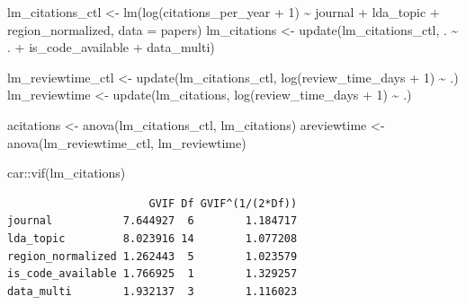 \documentclass[
  authoryear,
  review,
  3p]{elsarticle}
\newenvironment{Shaded}{\begin{snugshade}}{\end{snugshade}}
\newcommand{\AttributeTok}[1]{\textcolor[rgb]{0.40,0.45,0.13}{#1}}
\newcommand{\DecValTok}[1]{\textcolor[rgb]{0.68,0.00,0.00}{#1}}
\newcommand{\FunctionTok}[1]{\textcolor[rgb]{0.28,0.35,0.67}{#1}}
\newcommand{\NormalTok}[1]{\textcolor[rgb]{0.00,0.23,0.31}{#1}}
\newcommand{\OtherTok}[1]{\textcolor[rgb]{0.00,0.23,0.31}{#1}}
\newcommand{\SpecialCharTok}[1]{\textcolor[rgb]{0.37,0.37,0.37}{#1}}
\begin{document}
\begin{Shaded}
\begin{Highlighting}[]
\NormalTok{lm\_citations\_ctl }\OtherTok{\textless{}{-}} \FunctionTok{lm}\NormalTok{(}\FunctionTok{log}\NormalTok{(citations\_per\_year }\SpecialCharTok{+} \DecValTok{1}\NormalTok{) }\SpecialCharTok{\textasciitilde{}}\NormalTok{ journal }\SpecialCharTok{+}\NormalTok{ lda\_topic }\SpecialCharTok{+}\NormalTok{ region\_normalized, }\AttributeTok{data =}\NormalTok{ papers)}
\NormalTok{lm\_citations }\OtherTok{\textless{}{-}} \FunctionTok{update}\NormalTok{(lm\_citations\_ctl, . }\SpecialCharTok{\textasciitilde{}}\NormalTok{ . }\SpecialCharTok{+}\NormalTok{ is\_code\_available }\SpecialCharTok{+}\NormalTok{ data\_multi)}

\NormalTok{lm\_reviewtime\_ctl }\OtherTok{\textless{}{-}} \FunctionTok{update}\NormalTok{(lm\_citations\_ctl, }\FunctionTok{log}\NormalTok{(review\_time\_days }\SpecialCharTok{+} \DecValTok{1}\NormalTok{) }\SpecialCharTok{\textasciitilde{}}\NormalTok{ .)}
\NormalTok{lm\_reviewtime }\OtherTok{\textless{}{-}} \FunctionTok{update}\NormalTok{(lm\_citations, }\FunctionTok{log}\NormalTok{(review\_time\_days }\SpecialCharTok{+} \DecValTok{1}\NormalTok{) }\SpecialCharTok{\textasciitilde{}}\NormalTok{ .)}

\NormalTok{acitations }\OtherTok{\textless{}{-}} \FunctionTok{anova}\NormalTok{(lm\_citations\_ctl, lm\_citations)}
\NormalTok{areviewtime }\OtherTok{\textless{}{-}} \FunctionTok{anova}\NormalTok{(lm\_reviewtime\_ctl, lm\_reviewtime)}

\NormalTok{car}\SpecialCharTok{::}\FunctionTok{vif}\NormalTok{(lm\_citations)}
\end{Highlighting}
\end{Shaded}

\begin{verbatim}
                      GVIF Df GVIF^(1/(2*Df))
journal           7.644927  6        1.184717
lda_topic         8.023916 14        1.077208
region_normalized 1.262443  5        1.023579
is_code_available 1.766925  1        1.329257
data_multi        1.932137  3        1.116023
\end{verbatim}
\end{document}
